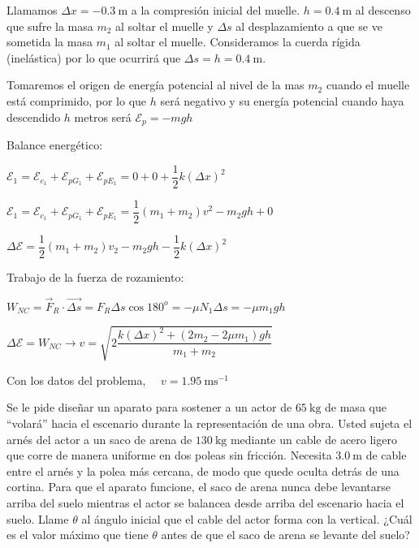 Llamamos $\Delta x=-0.3\ \mathrm{m}$ a la compresión inicial del muelle. $h=0.4\ \mathrm{m}$ al descenso que sufre la masa $m_2$ al soltar el muelle y $\Delta s$ al desplazamiento a que se ve sometida  la masa $m_1$ al soltar el muelle. Consideramos la cuerda rígida (inelástica) por lo que ocurrirá que $\Delta s=h=0.4\ \mathrm{m}$.

Tomaremos el origen de energía potencial al nivel de la mas $m_2$ cuando el muelle está comprimido, por lo que $h$ será negativo y su energía potencial cuando haya descendido $h$ metros será $\mathcal E_p=-mgh$

Balance energético:

$\mathcal E_1=\mathcal E_{c_1}+\mathcal E_{pG_1}+\mathcal E_{pE_1}=0+0+\dfrac 1 2 k (\Delta x)^2$

$\mathcal E_1=\mathcal E_{c_1}+\mathcal E_{pG_1}+\mathcal E_{pE_1}=\dfrac 1 2 (m_1+m_2)v^2-m_2gh+0$

$\Delta \mathcal E=\dfrac 1 2 (m_1+m_2)v_2-m_2gh-\dfrac 1 2 k (\Delta x)^2$

Trabajo de la fuerza de rozamiento:

$W_{NC}=\vec F_R \cdot \overrightarrow{\Delta s}=F_R \Delta s \cos 180^o =-\mu N_1 \Delta s=-\mu m_1 g h$

 $\Delta \mathcal E=W_{NC} \to v=\sqrt{2 \dfrac{k(\Delta x)^2+(2m_2-2\mu m_1) gh}{m_1+m_2}}$
 
 Con los datos del problema, $\quad v=1.95\ \mathrm{ms}^{-1}$

\vspace{15mm} %
\begin{prob}
Se le pide diseñar un aparato para sostener a un actor de $65 \ \mathrm{kg}$ de masa que ``volará'' hacia el escenario durante la representación de una obra. Usted sujeta el arnés del actor a un saco de arena de $130 \ \mathrm{kg}$ mediante un cable de acero ligero que corre de manera uniforme en dos poleas sin fricción. Necesita $3.0 \ \mathrm{m}$ de cable entre el arnés y la polea más cercana, de modo que quede oculta detrás de una cortina. Para que el aparato funcione, el saco de arena nunca debe levantarse arriba del suelo mientras el actor se balancea desde arriba del escenario hacia el suelo. Llame $\theta$ al ángulo inicial que el cable del actor forma con la vertical. ¿Cuál es el valor máximo que tiene $\theta$ antes de que el saco de arena se levante del suelo?	
\end{prob}

\newpage %

